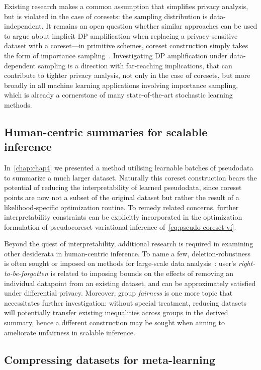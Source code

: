 Existing research makes a common assumption that simplifies privacy analysis, but is violated in the case of coresets: the sampling distribution is data-independent. It remains an open question whether similar approaches can be used to argue about implicit DP amplification when replacing a privacy-sensitive dataset with a coreset---in primitive schemes, coreset construction simply takes the form of importance sampling~\citep{bachem17}. Investigating DP amplification under data-dependent sampling is a direction with far-reaching implications, that can contribute to tighter privacy analysis, not only in the case of coresets, but more broadly in all machine learning applications involving importance sampling, which is already a cornerstone of many state-of-the-art stochastic learning methods. 


\subsection{Human-centric summaries for scalable inference}
\label{subsec:human-centric-pseudodata}

In~\cref{chap:chap4} we presented a method utilising learnable batches of pseudodata to summarize a much larger dataset. Naturally this coreset construction bears the potential of reducing the interpretability of learned pseudodata, since coreset points are now not a subset of the original dataset but rather the result of a likelihood-specific optimization routine. To remedy related concerns, further interpretability constraints can be explicitly incorporated in the optimization formulation of pseudocoreset variational inference of~\cref{eq:pseudo-coreset-vi}.

Beyond the quest of interpretability, additional research is required in examining other desiderata in human-centric inference. To name a few, deletion-robustness is often sought or imposed on methods for large-scale data analysis~\citep{mirzasoleiman17, ginart19}: user's \emph{right-to-be-forgotten} is related to imposing bounds on the effects of removing an individual datapoint from an existing dataset, and can be approximately satisfied under differential privacy. Moreover, group \emph{fairness} is one more topic that necessitates further investigation: without special treatment, reducing datasets will potentially transfer existing inequalities across groups in the derived summary, hence a different construction may be sought when aiming to ameliorate unfairness in scalable inference.  

\subsection{Compressing datasets for meta-learning}
\label{subsec:metacoresets}

